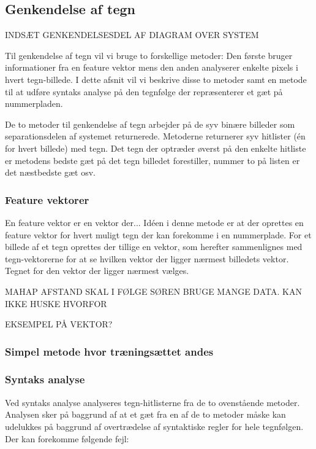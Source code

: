 \subsection{Genkendelse af tegn}

INDSÆT GENKENDELSESDEL AF DIAGRAM OVER SYSTEM
\label{sec_monster}

Til genkendelse af tegn vil vi bruge to forskellige metoder: Den første bruger informationer fra en feature vektor mens den anden analyserer enkelte pixels i hvert tegn-billede. I dette afsnit vil vi beskrive disse to metoder samt en metode til at udføre syntaks analyse på den tegnfølge der repræsenterer et gæt på nummerpladen.

De to metoder til genkendelse af tegn arbejder på de syv binære billeder som separationsdelen af systemet returnerede. Metoderne returnerer syv hitlister (én for hvert billede) med tegn. Det tegn der optræder øverst på den enkelte hitliste er metodens bedste gæt på det tegn billedet forestiller, nummer to på listen er det næstbedste gæt osv.

\subsubsection{Feature vektorer}
En feature vektor er en vektor der... Idéen i denne metode er at der oprettes en feature vektor for hvert muligt tegn der kan forekomme i en nummerplade. For et billede af et tegn oprettes der tillige en vektor, som herefter sammenlignes med tegn-vektorerne for at se hvilken vektor der ligger nærmest billedets vektor. Tegnet for den vektor der ligger nærmest vælges.

MAHAP AFSTAND SKAL I FØLGE SØREN BRUGE MANGE DATA. KAN IKKE HUSKE HVORFOR

EKSEMPEL PÅ VEKTOR?

\subsubsection{Simpel metode hvor træningsættet andes}

\subsubsection{Syntaks analyse}

Ved syntaks analyse analyseres tegn-hitlisterne fra de to ovenstående metoder. Analysen sker på baggrund af at et gæt fra en af de to metoder måske kan udelukkes på baggrund af overtrædelse af syntaktiske regler for hele tegnfølgen. Der kan forekomme følgende fejl:


